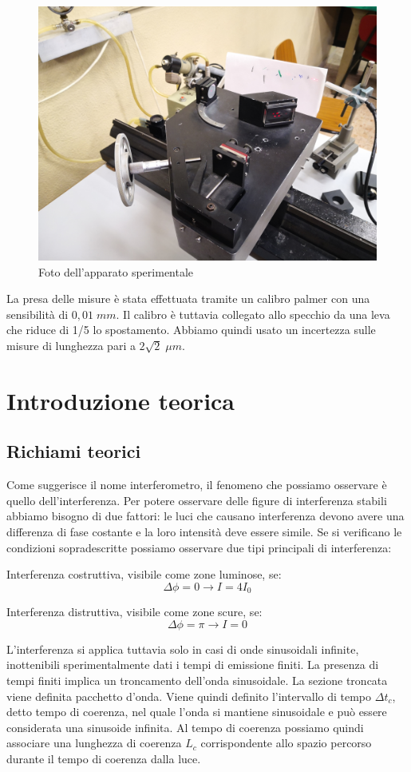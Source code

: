 \documentclass{article}
\begin{document}
\begin{figure}[h!]
  \centering
  \includegraphics[width=0.5\linewidth]{IM strumentazione}
  \caption{Foto dell'apparato sperimentale}
\end{figure}


La presa delle misure è stata effettuata tramite un calibro palmer con una sensibilità di $0,01 \; mm$. Il calibro è tuttavia collegato allo specchio da una leva che riduce di 1/5 lo spostamento. Abbiamo quindi usato un incertezza sulle misure di lunghezza pari a $2 \sqrt2 \; \mu m$.




\section{Introduzione teorica}
\subsection{Richiami teorici}
Come suggerisce il nome interferometro, il fenomeno che possiamo osservare è quello dell'interferenza. 
Per potere osservare delle figure di interferenza stabili abbiamo bisogno di due fattori: le luci che causano interferenza devono avere una differenza di fase costante e la loro intensità deve essere simile. Se si verificano le condizioni sopradescritte possiamo osservare due tipi principali di interferenza:

Interferenza costruttiva, visibile come zone luminose, se:
\[ \Delta \phi = 0 \rightarrow I = 4 I_0 \]

Interferenza distruttiva, visibile come zone scure, se: 
\[ \Delta \phi = \pi \rightarrow I = 0 \]

L'interferenza si applica tuttavia solo in casi di onde sinusoidali infinite, inottenibili sperimentalmente dati i tempi di emissione finiti. La presenza di tempi finiti implica un troncamento dell'onda sinusoidale. La sezione troncata viene definita pacchetto d'onda. Viene quindi definito l'intervallo di tempo $\Delta t_c$, detto tempo di coerenza, nel quale l'onda si mantiene sinusoidale e può essere considerata una sinusoide infinita. Al tempo di coerenza possiamo quindi associare una lunghezza di coerenza $L_c$ corrispondente allo spazio percorso durante il tempo di coerenza dalla luce.
\end{document}
